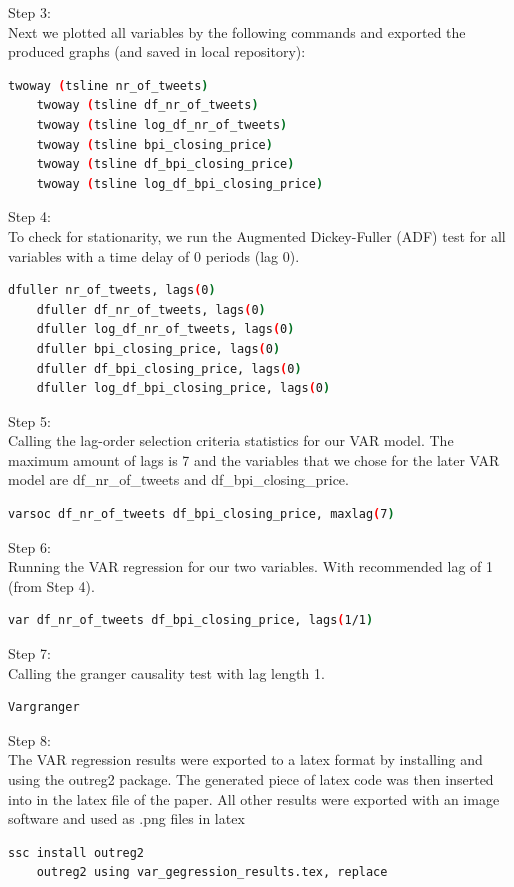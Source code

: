 \documentclass[a4paper,12pt]{article}
\begin{document}
\begin{spacing}{1.2}
Step 3:\\
Next we plotted all variables by the following commands and exported the produced graphs (and saved in local repository):\\
	\begin{lstlisting}[language=bash]
	twoway (tsline nr_of_tweets)
	twoway (tsline df_nr_of_tweets)
	twoway (tsline log_df_nr_of_tweets)
	twoway (tsline bpi_closing_price)
	twoway (tsline df_bpi_closing_price)
	twoway (tsline log_df_bpi_closing_price)
	\end{lstlisting}

Step 4:\\
To check for stationarity, we run the Augmented Dickey-Fuller (ADF) test for all variables with a time delay of 0 periods (lag 0).\\
	\begin{lstlisting}[language=bash]
	dfuller nr_of_tweets, lags(0)
	dfuller df_nr_of_tweets, lags(0)
	dfuller log_df_nr_of_tweets, lags(0)
	dfuller bpi_closing_price, lags(0)
	dfuller df_bpi_closing_price, lags(0)
	dfuller log_df_bpi_closing_price, lags(0)
	\end{lstlisting}

Step 5:\\
Calling the lag-order selection criteria statistics for our VAR model. The maximum amount of lags is 7 and the variables that we chose for the later VAR model are df\_nr\_of\_tweets and df\_bpi\_closing\_price.\\
	\begin{lstlisting}[language=bash]
	varsoc df_nr_of_tweets df_bpi_closing_price, maxlag(7)
	\end{lstlisting}

Step 6:\\
Running the VAR regression for our two variables. With recommended lag of 1 (from Step 4).\\
	\begin{lstlisting}[language=bash]
	var df_nr_of_tweets df_bpi_closing_price, lags(1/1)
	\end{lstlisting}

Step 7:\\
Calling the granger causality test with lag length 1.\\
	\begin{lstlisting}[language=bash]
	Vargranger
	\end{lstlisting}

Step 8:\\
The VAR regression results were exported to a latex format by installing and using the outreg2 package. The generated piece of latex code was then inserted into in the latex file of the paper. All other results were exported with an image software and used as .png files in latex\\
	\begin{lstlisting}[language=bash]
	ssc install outreg2
	outreg2 using var_gegression_results.tex, replace
	\end{lstlisting}

\end{spacing}
\clearpage
\end{document}
